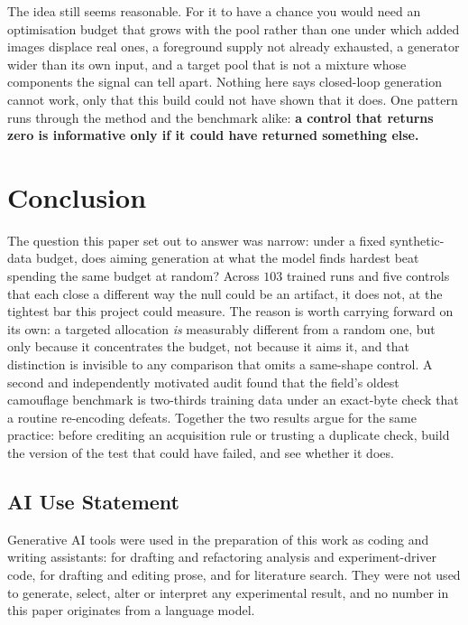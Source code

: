 \documentclass{article} %
\begin{document}
The idea still seems reasonable. For it to have a chance you would need an optimisation budget that
grows with the pool rather than one under which added images displace real ones, a foreground supply
not already exhausted, a generator wider than its own input, and a target pool that is not a mixture
whose components the signal can tell apart. Nothing here says closed-loop generation cannot work,
only that this build could not have shown that it does. One pattern runs through the method and the
benchmark alike: \textbf{a control that returns zero is informative only if it could have returned
something else.}

\section{Conclusion}
\label{sec:conclusion}
The question this paper set out to answer was narrow: under a fixed synthetic-data budget, does
aiming generation at what the model finds hardest beat spending the same budget at random? Across
$103$ trained runs and five controls that each close a different way the null could be an artifact,
it does not, at the tightest bar this project could measure. The reason is worth carrying forward on
its own: a targeted allocation \emph{is} measurably different from a random one, but only because it
concentrates the budget, not because it aims it, and that distinction is invisible to any comparison
that omits a same-shape control. A second and independently motivated audit found that the field's
oldest camouflage benchmark is two-thirds training data under an exact-byte check that a routine
re-encoding defeats. Together the two results argue for the same practice: before crediting an
acquisition rule or trusting a duplicate check, build the version of the test that could have
failed, and see whether it does.

\subsection*{AI Use Statement}

Generative AI tools were used in the preparation of this work as coding and writing assistants:
for drafting and refactoring analysis and experiment-driver code, for drafting and editing prose,
and for literature search. They were not used to generate, select, alter or interpret any
experimental result, and no number in this paper originates from a language model.
\end{document}
